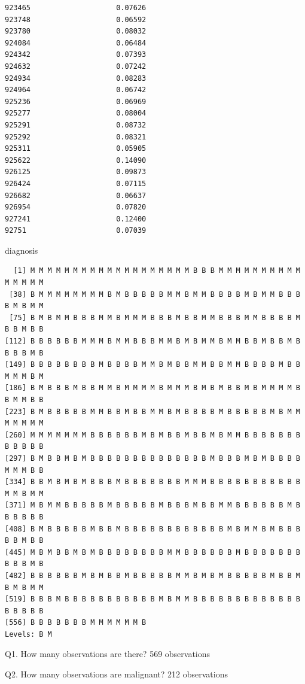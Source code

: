 \documentclass[
  letterpaper,
  DIV=11,
  numbers=noendperiod]{scrartcl}
\newenvironment{Shaded}{\begin{snugshade}}{\end{snugshade}}
\newcommand{\NormalTok}[1]{\textcolor[rgb]{0.00,0.23,0.31}{#1}}
\begin{document}
\begin{verbatim}
923465                    0.07626
923748                    0.06592
923780                    0.08032
924084                    0.06484
924342                    0.07393
924632                    0.07242
924934                    0.08283
924964                    0.06742
925236                    0.06969
925277                    0.08004
925291                    0.08732
925292                    0.08321
925311                    0.05905
925622                    0.14090
926125                    0.09873
926424                    0.07115
926682                    0.06637
926954                    0.07820
927241                    0.12400
92751                     0.07039
\end{verbatim}

\begin{Shaded}
\begin{Highlighting}[]
\NormalTok{diagnosis}
\end{Highlighting}
\end{Shaded}

\begin{verbatim}
  [1] M M M M M M M M M M M M M M M M M M M B B B M M M M M M M M M M M M M M M
 [38] B M M M M M M M M B M B B B B B M M B M M B B B B M B M M B B B B M B M M
 [75] B M B M M B B B M M B M M M B B B M B B M M B B B M M B B B B M B B M B B
[112] B B B B B B M M M B M M B B B M M B M B M M B M M B B M B B M B B B B M B
[149] B B B B B B B B M B B B B M M B M B B M M B B M M B B B B M B B M M M B M
[186] B M B B B M B B M M B M M M M B M M M B M B M B B M B M M M M B B M M B B
[223] B M B B B B B M M B B M B B M M B M B B B B M B B B B B M B M M M M M M M
[260] M M M M M M M B B B B B B M B M B B M B B M B M M B B B B B B B B B B B B
[297] B M B B M B M B B B B B B B B B B B B B B M B B B M B M B B B B M M M B B
[334] B B M B M B M B B B M B B B B B B B M M M B B B B B B B B B B B M M B M M
[371] M B M M B B B B B M B B B B B M B B B M B B M M B B B B B B M B B B B B B
[408] B M B B B B B M B B M B B B B B B B B B B B B M B M M B M B B B B B M B B
[445] M B M B B M B M B B B B B B B B M M B B B B B B M B B B B B B B B B B M B
[482] B B B B B B M B M B B M B B B B B M M B M B M B B B B B M B B M B M B M M
[519] B B B M B B B B B B B B B B B M B M M B B B B B B B B B B B B B B B B B B
[556] B B B B B B B M M M M M M B
Levels: B M
\end{verbatim}

Q1. How many observations are there? 569 observations

Q2. How many observations are malignant? 212 observations
\end{document}
